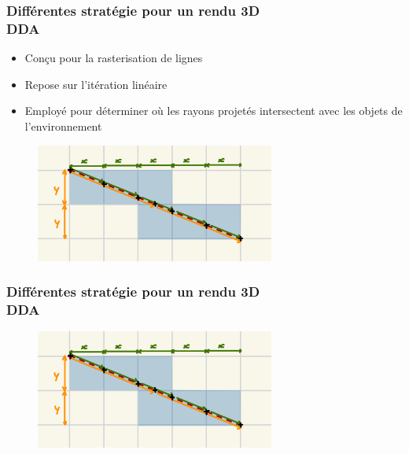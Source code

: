 \documentclass{beamer}
\begin{document}
\begin{frame}
    \frametitle{Différentes stratégie pour un rendu 3D \\
                \small DDA}           
    \begin{block}{}
        \begin{itemize}
            \item Conçu pour la rasterisation de lignes
            \item Repose sur l'itération linéaire
            \item Employé pour déterminer où les rayons projetés intersectent avec les objets de l'environnement
        \end{itemize}
    \end{block}    
    \begin{figure}
        \centering
        \includegraphics[width=0.7\textwidth]{images/DDA.jpg}
    \end{figure}
\end{frame}

\begin{frame}
    \frametitle{Différentes stratégie pour un rendu 3D \\
                \small DDA}           
    \begin{block}{}
    \end{block}    
    \begin{figure}
        \centering
        \includegraphics[width=0.7\textwidth]{images/DDA.jpg}
    \end{figure}
\end{frame}
\end{document}
